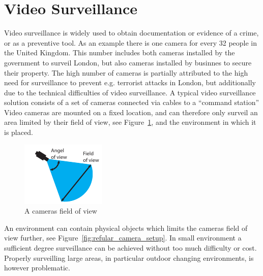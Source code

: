 \section{Video Surveillance}\label{sec:video_surveillance}
Video surveillance is widely used to obtain documentation or evidence of a crime, or as a preventive tool.
As an example there is one camera for every 32 people in the United Kingdom\citep{london_camera_surveillance}.
This number includes both cameras installed by the government to surveil London, but also cameras installed by businnes to secure their property.
The high number of cameras is partially attributed to the high need for surveillance to prevent e.g. terrorist attacks in London, but additionally due to the technical difficulties of video surveillance.
A typical video surveillance solution consists of a set of cameras connected via cables to a ``command station''
Video cameras are mounted on a fixed location, and can therefore only surveil an area limited by their field of view, see Figure~\ref{fig:camera_properties}, and the environment in which it is placed.

\begin{figure}[htb]
    \centering 
    \includegraphics[scale=1.8]{gfx/camera_properties.pdf}
    \caption{A cameras field of view}
    \label{fig:camera_properties}
\end{figure}

An environment can contain physical objects which limits the cameras field of view further, see Figure~\ref{fig:refular_camera_setup}.
In small environment a sufficient degree surveillance can be achieved without too much difficulty or cost.
Properly surveilling large areas, in particular outdoor changing environments, is however problematic.


